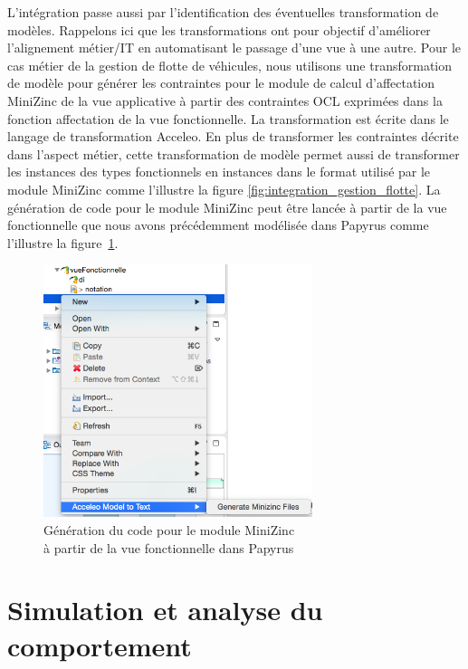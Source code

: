 L'intégration passe aussi par l'identification des éventuelles transformation de
modèles. Rappelons ici que les transformations ont pour objectif d'améliorer
l'alignement métier/IT en automatisant le passage d'une vue à une autre. Pour le
cas métier de la gestion de flotte de véhicules, nous utilisons une
transformation de modèle pour générer les contraintes pour le module de calcul
d'affectation MiniZinc de la vue applicative à partir des contraintes OCL
exprimées dans la fonction affectation de la vue fonctionnelle. La
transformation est écrite dans le langage de transformation Acceleo. En plus de
transformer les contraintes décrite dans l'aspect métier, cette transformation
de modèle permet aussi de transformer les instances des types fonctionnels en
instances dans le format  utilisé par le module MiniZinc comme
l'illustre la figure \ref{fig:integration_gestion_flotte}. La génération de code
pour le module MiniZinc peut être lancée à partir de la vue fonctionnelle que
nous avons précédemment modélisée dans Papyrus comme l'illustre la
figure~\ref{fig:acceleo_papyrus}.

\begin{figure}[!htbp]
 \begin{center}
  \includegraphics[width=0.7\textwidth]{figures/5_implementation/acceleo_papyrus.png}
 \end{center}
 \caption{Génération du code pour le module MiniZinc\\à partir de la vue fonctionnelle dans Papyrus}
 \label{fig:acceleo_papyrus}
\end{figure}




\section{Simulation et analyse du comportement}


